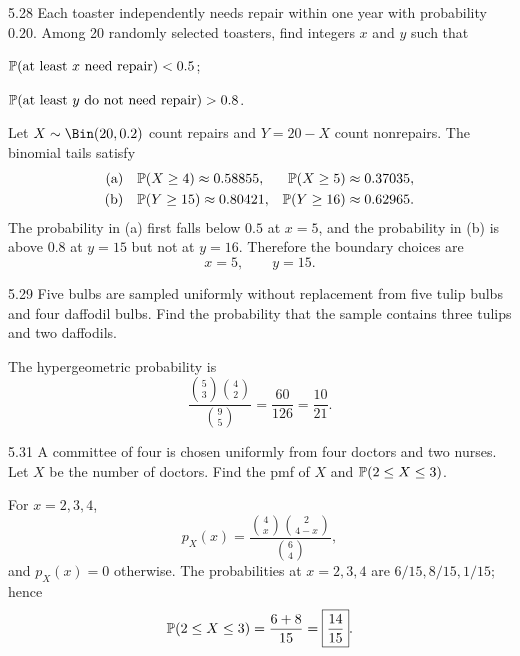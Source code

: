 \documentclass[11pt,oneside]{article}
\begin{document}
\begin{exercise}{5.28}
Each toaster independently needs repair within one year with probability $0.20$. Among 20 randomly selected toasters, find integers $x$ and $y$ such that
\begin{exercisesubparts}
\item $\mathbb{P}(\text{at least }x\text{ need repair})<0.5$;
\item $\mathbb{P}(\text{at least }y\text{ do not need repair})>0.8$.
\end{exercisesubparts}
\end{exercise}

\begin{solution}
Let $X\sim\Bin(20,0.2)$ count repairs and $Y=20-X$ count nonrepairs. The binomial tails satisfy
\[
\begin{aligned}
\textup{(a)}\quad&\mathbb{P}(X\ge4)\approx0.58855,
&\mathbb{P}(X\ge5)&\approx0.37035,\\
\textup{(b)}\quad&\mathbb{P}(Y\ge15)\approx0.80421,
&\mathbb{P}(Y\ge16)&\approx0.62965.
\end{aligned}
\]
The probability in (a) first falls below $0.5$ at $x=5$, and the probability in (b) is above $0.8$ at $y=15$ but not at $y=16$. Therefore the boundary choices are
\[\boxed{x=5,\qquad y=15}.\]
\end{solution}

\begin{exercise}{5.29}
Five bulbs are sampled uniformly without replacement from five tulip bulbs and four daffodil bulbs. Find the probability that the sample contains three tulips and two daffodils.
\end{exercise}

\begin{solution}
The hypergeometric probability is
\[
\frac{\binom{5}{3}\binom{4}{2}}{\binom{9}{5}}=\frac{60}{126}=\boxed{\frac{10}{21}}.
\]
\end{solution}

\begin{exercise}{5.31}
A committee of four is chosen uniformly from four doctors and two nurses. Let $X$ be the number of doctors. Find the pmf of $X$ and $\mathbb{P}(2\le X\le3)$.
\end{exercise}

\begin{solution}
For $x=2,3,4$,
\[
p_X(x)=\boxed{\frac{\binom{4}{x}\binom{2}{4-x}}{\binom{6}{4}}},
\]
and $p_X(x)=0$ otherwise. The probabilities at $x=2,3,4$ are $6/15,8/15,1/15$; hence
\[
\mathbb{P}(2\le X\le3)=\frac{6+8}{15}=\boxed{\frac{14}{15}}.
\]
\end{solution}
\end{document}
